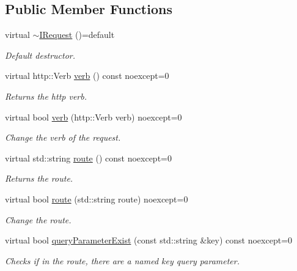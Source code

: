 \subsection*{Public Member Functions}
\begin{DoxyCompactItemize}
\item 
\mbox{\label{structhttp_1_1IRequest_afafa06d3a8691b6faf06f2a0cc53845c}} 
virtual \hyperlink{structhttp_1_1IRequest_afafa06d3a8691b6faf06f2a0cc53845c}{$\sim$\+I\+Request} ()=default
\begin{DoxyCompactList}\small\item\em Default destructor. \end{DoxyCompactList}\item 
virtual http\+::\+Verb \hyperlink{structhttp_1_1IRequest_aef9304b69674a5c9873a33564b51d527}{verb} () const noexcept=0
\begin{DoxyCompactList}\small\item\em Returns the http verb. \end{DoxyCompactList}\item 
virtual bool \hyperlink{structhttp_1_1IRequest_abcb6f9f77b7d800677e9af3728500fa8}{verb} (http\+::\+Verb verb) noexcept=0
\begin{DoxyCompactList}\small\item\em Change the verb of the request. \end{DoxyCompactList}\item 
virtual std\+::string \hyperlink{structhttp_1_1IRequest_aa7827e21a7d25038ebc1124ae08f02de}{route} () const noexcept=0
\begin{DoxyCompactList}\small\item\em Returns the route. \end{DoxyCompactList}\item 
virtual bool \hyperlink{structhttp_1_1IRequest_a76f3dfba1e9396a0865ea133af371b80}{route} (std\+::string route) noexcept=0
\begin{DoxyCompactList}\small\item\em Change the route. \end{DoxyCompactList}\item 
virtual bool \hyperlink{structhttp_1_1IRequest_a3f2a5c8775396ac91971881d88d59c62}{query\+Parameter\+Exist} (const std\+::string \&key) const noexcept=0
\begin{DoxyCompactList}\small\item\em Checks if in the route, there are a named \textquotesingle{}key\textquotesingle{} query parameter. \end{DoxyCompactList}\item 

\end{DoxyCompactItemize}
